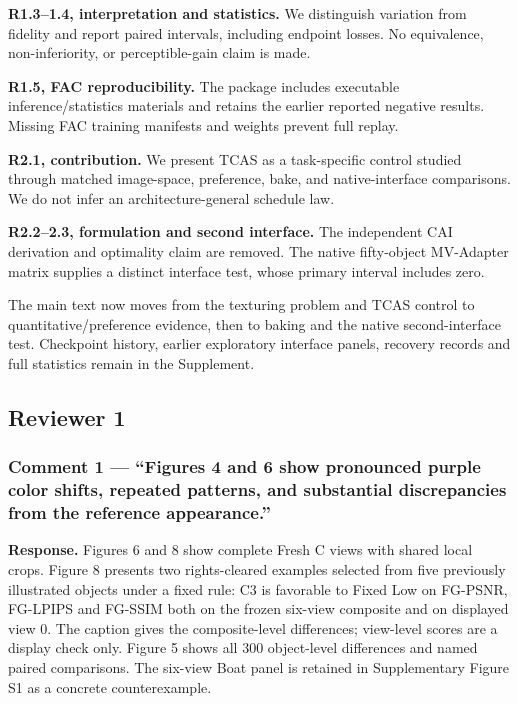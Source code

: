 \documentclass[
  10pt,
]{article}
\begin{document}
\textbf{R1.3--1.4, interpretation and statistics.} We distinguish variation from fidelity and report paired intervals, including endpoint losses. No equivalence, non-inferiority, or perceptible-gain claim is made.

\textbf{R1.5, FAC reproducibility.} The package includes executable inference/statistics materials and retains the earlier reported negative results. Missing FAC training manifests and weights prevent full replay.

\textbf{R2.1, contribution.} We present TCAS as a task-specific control studied through matched image-space, preference, bake, and native-interface comparisons. We do not infer an architecture-general schedule law.

\textbf{R2.2--2.3, formulation and second interface.} The independent CAI derivation and optimality claim are removed. The native fifty-object MV-Adapter matrix supplies a distinct interface test, whose primary interval includes zero.

The main text now moves from the texturing problem and TCAS control to quantitative/preference evidence, then to baking and the native second-interface test. Checkpoint history, earlier exploratory interface panels, recovery records and full statistics remain in the Supplement.

\hypertarget{reviewer-1}{%
\subsection{Reviewer 1}\label{reviewer-1}}

\hypertarget{comment-1--figures-4-and-6-show-pronounced-purple-color-shifts-repeated-patterns-and-substantial-discrepancies-from-the-reference-appearance}{%
\subsubsection{Comment 1 --- ``Figures 4 and 6 show pronounced purple color shifts, repeated patterns, and substantial discrepancies from the reference appearance.''}\label{comment-1--figures-4-and-6-show-pronounced-purple-color-shifts-repeated-patterns-and-substantial-discrepancies-from-the-reference-appearance}}

\textbf{Response.} Figures 6 and 8 show complete Fresh C views with shared local crops. Figure 8 presents two rights-cleared examples selected from five previously illustrated objects under a fixed rule: C3 is favorable to Fixed Low on FG-PSNR, FG-LPIPS and FG-SSIM both on the frozen six-view composite and on displayed view 0. The caption gives the composite-level differences; view-level scores are a display check only. Figure 5 shows all 300 object-level differences and named paired comparisons. The six-view Boat panel is retained in Supplementary Figure S1 as a concrete counterexample.
\end{document}
